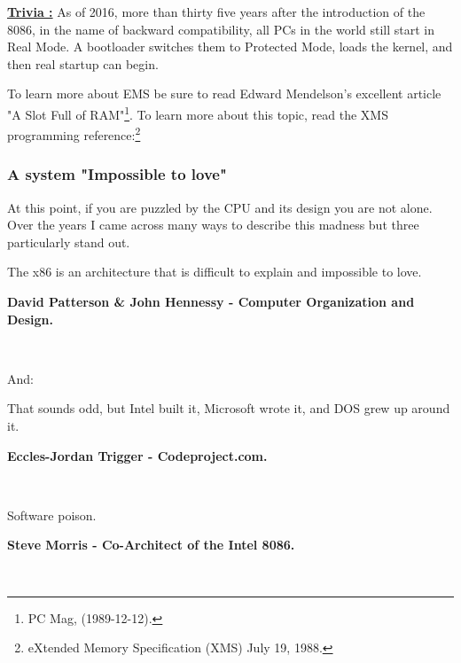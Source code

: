 \documentclass[book.tex]{subfiles}
\begin{document}
\textbf{\underline{Trivia :}}  As of 2016, more than thirty five years after the introduction of the 8086, in the name of backward compatibility, all PCs in the world still start in Real Mode. A bootloader switches them to Protected Mode, loads the kernel, and then real startup can begin.

\bigskip
To learn more about EMS be sure to read Edward Mendelson's excellent article "A Slot Full of RAM"\footnote{PC Mag, (1989-12-12).}. To learn more about this topic, read the XMS programming reference:\footnote{eXtended Memory Specification (XMS) July 19, 1988.}\\
\par

\subsubsection{A system "Impossible to love"}
At this point, if you are puzzled by the CPU and its design you are not alone. Over the years I came across many ways to describe this madness but three particularly stand out.\\
\par
 \begin{fancyquotes}
   The x86 is an architecture that is difficult to explain and impossible to love.\\
   \par
\textbf{David Patterson \& John Hennessy - Computer Organization and Design.}
 \end{fancyquotes}\\
\par
And:\\
\par
 \begin{fancyquotes}
    That sounds odd, but Intel built it, Microsoft wrote it, and DOS grew up around it.\\
   \par
\textbf{Eccles-Jordan Trigger - Codeproject.com.}
 \end{fancyquotes}\\
\par
 \begin{fancyquotes}
    Software poison.\\
   \par
\textbf{Steve Morris - Co-Architect of the Intel 8086.}
 \end{fancyquotes}\\
\end{document}
